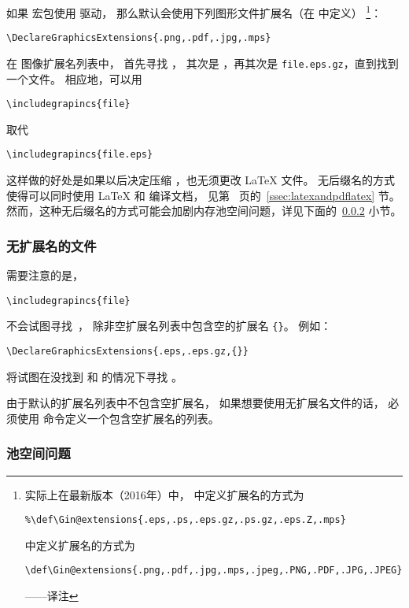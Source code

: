 如果  宏包使用  驱动，
那么默认会使用下列图形文件扩展名（在  中定义）
\footnote{
	实际上在最新版本（2016年）中， 中定义扩展名的方式为
\begin{lstlisting}
%\def\Gin@extensions{.eps,.ps,.eps.gz,.ps.gz,.eps.Z,.mps}
\end{lstlisting}
	 中定义扩展名的方式为
\begin{lstlisting}
\def\Gin@extensions{.png,.pdf,.jpg,.mps,.jpeg,.PNG,.PDF,.JPG,.JPEG}
\end{lstlisting}
	——译注}：
\begin{lstlisting}
\DeclareGraphicsExtensions{.png,.pdf,.jpg,.mps}
\end{lstlisting}

在  图像扩展名列表中，
 首先寻找 ，
其次是 ，再其次是 \texttt{file.eps.gz}，直到找到一个文件。
相应地，可以用
\begin{lstlisting}
\includegrapincs{file}
\end{lstlisting}
取代
\begin{lstlisting}
\includegrapincs{file.eps}
\end{lstlisting}
这样做的好处是如果以后决定压缩 ，也无须更改 \LaTeX{} 文件。
无后缀名的方式使得可以同时使用 \LaTeX{} 和 \pdfLaTeX{} 编译文档，
见第~\pageref{ssec:latexandpdflatex} 页的~\ref{ssec:latexandpdflatex} 节。
然而，这种无后缀名的方式可能会加剧内存池空间问题，详见下面的~\ref{sssec:poolspaceproblem} 小节。

\subsubsection{无扩展名的文件}
需要注意的是，
\begin{lstlisting}
\includegrapincs{file}
\end{lstlisting}
不会试图寻找~，
除非空扩展名列表中包含空的扩展名 \verb+{}+。
例如：
\begin{lstlisting}
\DeclareGraphicsExtensions{.eps,.eps.gz,{}}
\end{lstlisting}
将试图在没找到  和  的情况下寻找 。

由于默认的扩展名列表中不包含空扩展名，
如果想要使用无扩展名文件的话，
必须使用  命令定义一个包含空扩展名的列表。

\subsubsection{池空间问题}\label{sssec:poolspaceproblem}


